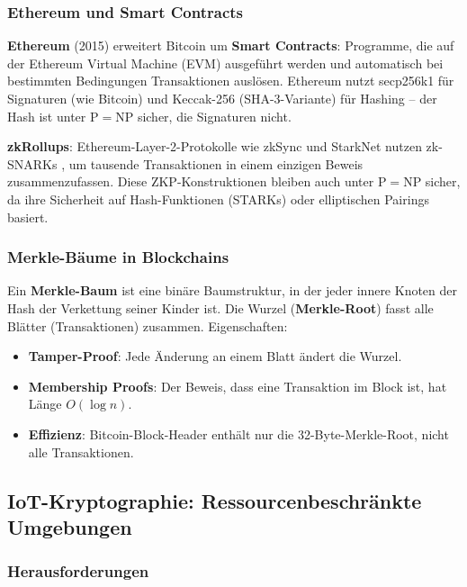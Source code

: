 ﻿\documentclass[a4paper,12pt]{scrreprt}
\theoremstyle{definition}
\begin{document}
\subsubsection{Ethereum und Smart Contracts}

\textbf{Ethereum} (2015) erweitert Bitcoin um \textbf{Smart Contracts}: Programme, die auf der Ethereum Virtual Machine (EVM) ausgeführt werden und automatisch bei bestimmten Bedingungen Transaktionen auslösen. Ethereum nutzt secp256k1 für Signaturen (wie Bitcoin) und Keccak-256 (SHA-3-Variante) für Hashing -- der Hash ist unter $\mathrm{P}=\mathrm{NP}$ sicher, die Signaturen nicht.

\textbf{zkRollups}: Ethereum-Layer-2-Protokolle wie zkSync und StarkNet nutzen zk-SNARKs \cite{GGPR13}, um tausende Transaktionen in einem einzigen Beweis zusammenzufassen. Diese ZKP-Konstruktionen bleiben auch unter $\mathrm{P}=\mathrm{NP}$ sicher, da ihre Sicherheit auf Hash-Funktionen (STARKs) oder elliptischen Pairings basiert.

\subsubsection{Merkle-Bäume in Blockchains}

Ein \textbf{Merkle-Baum} \cite{Dam89} ist eine binäre Baumstruktur, in der jeder innere Knoten der Hash der Verkettung seiner Kinder ist. Die Wurzel (\textbf{Merkle-Root}) fasst alle Blätter (Transaktionen) zusammen. Eigenschaften:
\begin{itemize}
    \item \textbf{Tamper-Proof}: Jede Änderung an einem Blatt ändert die Wurzel.
    \item \textbf{Membership Proofs}: Der Beweis, dass eine Transaktion im Block ist, hat Länge $O(\log n)$.
    \item \textbf{Effizienz}: Bitcoin-Block-Header enthält nur die 32-Byte-Merkle-Root, nicht alle Transaktionen.
\end{itemize}

\subsection{IoT-Kryptographie: Ressourcenbeschränkte Umgebungen}

\subsubsection{Herausforderungen}
\end{document}
